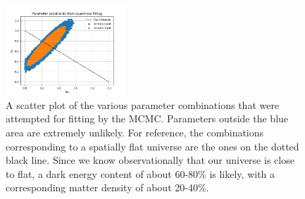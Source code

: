 \begin{figure}[h!tbp]
\centering
\includegraphics[width=0.4\textwidth]{../Milestone 1/Plots/supernovafitting_confidence_regions.png}
\caption{A scatter plot of the various parameter combinations that were attempted for fitting by the MCMC. Parameters outside the blue area are extremely unlikely. For reference, the combinations corresponding to a spatially flat universe are the ones on the dotted black line. Since we know observationally that our universe is close to flat, a dark energy content of about 60-80\% is likely, with a corresponding matter density of about 20-40\%.}
\label{fig:milestone_1_supernovafitting_confidence_regions}
\end{figure}
